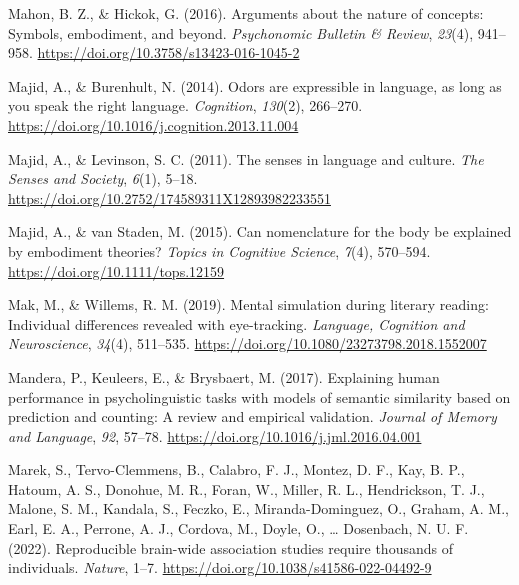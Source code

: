 \documentclass[
  12pt,
  man,floatsintext]{apa7}
\newlength{\cslhangindent}
\newlength{\cslentryspacingunit} %
\newenvironment{CSLReferences}[2] %
 {%
  \setlength{\parindent}{0pt}
  \ifodd #1
  \let\oldpar\par
  \def\par{\hangindent=\cslhangindent\oldpar}
  \fi
  \setlength{\parskip}{#2\cslentryspacingunit}
 }%
 {}
\begin{document}
\begin{CSLReferences}{1}{0}
\leavevmode{}%
Mahon, B. Z., \& Hickok, G. (2016). Arguments about the nature of concepts: {Symbols}, embodiment, and beyond. \emph{Psychonomic Bulletin \& Review}, \emph{23}(4), 941--958. \url{https://doi.org/10.3758/s13423-016-1045-2}

\leavevmode{}%
Majid, A., \& Burenhult, N. (2014). Odors are expressible in language, as long as you speak the right language. \emph{Cognition}, \emph{130}(2), 266--270. \url{https://doi.org/10.1016/j.cognition.2013.11.004}

\leavevmode{}%
Majid, A., \& Levinson, S. C. (2011). The senses in language and culture. \emph{The Senses and Society}, \emph{6}(1), 5--18. \url{https://doi.org/10.2752/174589311X12893982233551}

\leavevmode{}%
Majid, A., \& van Staden, M. (2015). Can nomenclature for the body be explained by embodiment theories? \emph{Topics in Cognitive Science}, \emph{7}(4), 570--594. \url{https://doi.org/10.1111/tops.12159}

\leavevmode{}%
Mak, M., \& Willems, R. M. (2019). Mental simulation during literary reading: {Individual} differences revealed with eye-tracking. \emph{Language, Cognition and Neuroscience}, \emph{34}(4), 511--535. \url{https://doi.org/10.1080/23273798.2018.1552007}

\leavevmode{}%
Mandera, P., Keuleers, E., \& Brysbaert, M. (2017). Explaining human performance in psycholinguistic tasks with models of semantic similarity based on prediction and counting: {A} review and empirical validation. \emph{Journal of Memory and Language}, \emph{92}, 57--78. \url{https://doi.org/10.1016/j.jml.2016.04.001}

\leavevmode{}%
Marek, S., Tervo-Clemmens, B., Calabro, F. J., Montez, D. F., Kay, B. P., Hatoum, A. S., Donohue, M. R., Foran, W., Miller, R. L., Hendrickson, T. J., Malone, S. M., Kandala, S., Feczko, E., Miranda-Dominguez, O., Graham, A. M., Earl, E. A., Perrone, A. J., Cordova, M., Doyle, O., \ldots{} Dosenbach, N. U. F. (2022). Reproducible brain-wide association studies require thousands of individuals. \emph{Nature}, 1--7. \url{https://doi.org/10.1038/s41586-022-04492-9}


\end{CSLReferences}
\end{document}
